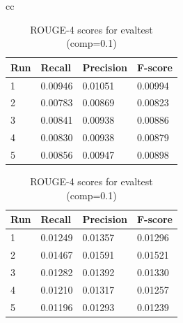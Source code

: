 \documentclass[11pt]{article}
\begin{document}
\begin{table}[!ht]
\begin{tabular}{cc}
\begin{minipage}{1.05\linewidth}
\centering
\caption*{ROUGE-4 scores for devtest (comp=0.1)}
\begin{tabular}{|l|l|l|l|}
\hline
Run   & Recall  & Precision & F-score \\ \hline
1 & 0.00946 & 0.01051   & 0.00994 \\ \hline
2 & 0.00783 & 0.00869   & 0.00823 \\ \hline
3 & 0.00841 & 0.00938   & 0.00886 \\ \hline
4 & 0.00830 & 0.00938   & 0.00879 \\ \hline
5 & 0.00856 & 0.00947   & 0.00898 \\ \hline
\end{tabular}
\end{minipage} 

\begin{minipage}{1.05\linewidth}
\centering
\caption*{ROUGE-4 scores for evaltest (comp=0.1)}
\begin{tabular}{|l|l|l|l|}
\hline
Run   & Recall  & Precision & F-score \\ \hline
1 & 0.01249 & 0.01357   & 0.01296 \\ \hline
2 & 0.01467 & 0.01591   & 0.01521 \\ \hline
3 & 0.01282 & 0.01392   & 0.01330 \\ \hline
4 & 0.01210 & 0.01317   & 0.01257 \\ \hline
5 & 0.01196 & 0.01293   & 0.01239 \\ \hline
\end{tabular}
\end{minipage}
\end{tabular}
\end{table}
\end{document}
